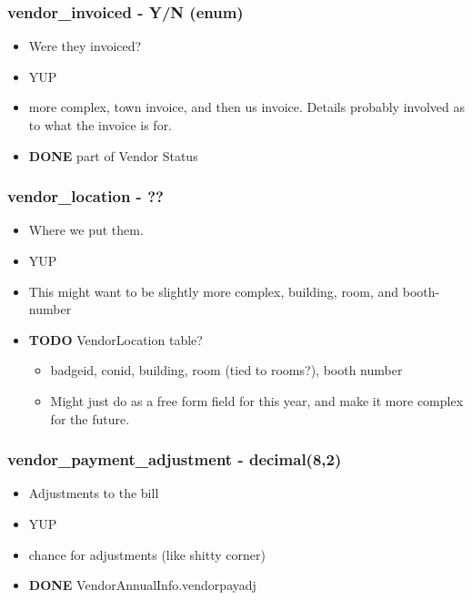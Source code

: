 \documentclass[captions=tablesignature]{scrartcl}
\begin{document}
\subsubsection{vendor\_invoiced - Y/N (enum)}
\label{sec-2-2-13}
\begin{itemize}
\item Were they invoiced?
\item YUP
\item more complex, town invoice, and then us invoice.  Details probably
involved as to what the invoice is for.
\end{itemize}
\begin{itemize}
\item {\bfseries\sffamily DONE} part of Vendor Status
\label{sec-2-2-13-1}
\end{itemize}

\subsubsection{vendor\_location - ??}
\label{sec-2-2-14}
\begin{itemize}
\item Where we put them.
\item YUP
\item This might want to be slightly more complex, building, room, and
booth-number
\end{itemize}
\begin{itemize}
\item {\bfseries\sffamily TODO} VendorLocation table?
\label{sec-2-2-14-1}
\begin{itemize}
\item badgeid, conid, building, room (tied to rooms?), booth number
\item Might just do as a free form field for this year, and make it
more complex for the future.
\end{itemize}
\end{itemize}

\subsubsection{vendor\_payment\_adjustment - decimal(8,2)}
\label{sec-2-2-15}
\begin{itemize}
\item Adjustments to the bill
\item YUP
\item chance for adjustments (like shitty corner)
\end{itemize}
\begin{itemize}
\item {\bfseries\sffamily DONE} VendorAnnualInfo.vendorpayadj
\label{sec-2-2-15-1}
\end{itemize}
\end{document}
